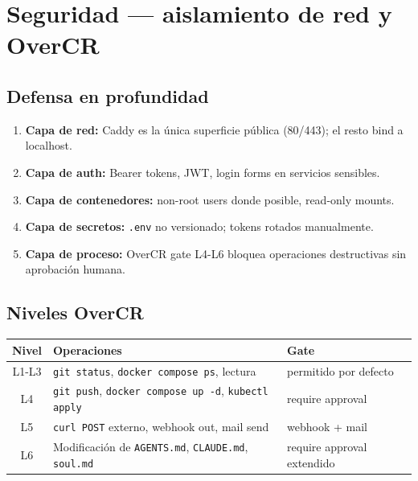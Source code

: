 \documentclass[11pt,a4paper]{article}
\begin{document}
\newpage

\section{Seguridad — aislamiento de red y OverCR}

\subsection{Defensa en profundidad}

\begin{enumerate}[leftmargin=*,itemsep=2pt]
\item \textbf{Capa de red:} Caddy es la única superficie pública (80/443); el resto bind a localhost.
\item \textbf{Capa de auth:} Bearer tokens, JWT, login forms en servicios sensibles.
\item \textbf{Capa de contenedores:} non-root users donde posible, read-only mounts.
\item \textbf{Capa de secretos:} \texttt{.env} no versionado; tokens rotados manualmente.
\item \textbf{Capa de proceso:} OverCR gate L4-L6 bloquea operaciones destructivas sin aprobación humana.
\end{enumerate}

\subsection{Niveles OverCR}

\begin{center}
\begin{tabular}{|c|l|l|}
\hline
\rowcolor{hermesblue}\color{white}\textbf{Nivel} & \color{white}\textbf{Operaciones} & \color{white}\textbf{Gate}\\
\hline
L1-L3 & \texttt{git status}, \texttt{docker compose ps}, lectura & permitido por defecto\\
L4 & \texttt{git push}, \texttt{docker compose up -d}, \texttt{kubectl apply} & require approval\\
L5 & \texttt{curl POST} externo, webhook out, mail send & webhook + mail\\
L6 & Modificación de \texttt{AGENTS.md}, \texttt{CLAUDE.md}, \texttt{soul.md} & require approval extendido\\
\hline
\end{tabular}
\end{center}
\end{document}
